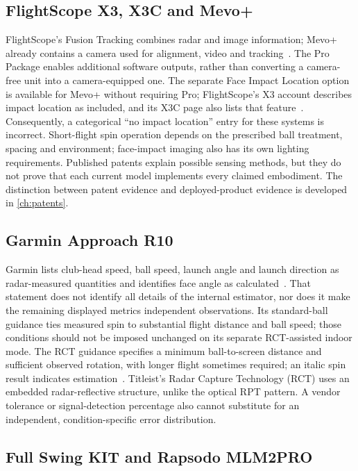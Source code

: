 \subsection{FlightScope X3, X3C and Mevo+}

FlightScope's Fusion Tracking combines radar and image information; Mevo+ already contains a camera used for alignment, video and tracking~\cite{flightscopefaq}.
The Pro Package enables additional software outputs, rather than converting a camera-free unit into a camera-equipped one.
The separate Face Impact Location option is available for Mevo+ without requiring Pro; FlightScope's X3 account describes impact location as included, and its X3C page also lists that feature~\cite{flightscopefaceimpact,flightscopex3csetup}.
Consequently, a categorical ``no impact location'' entry for these systems is incorrect.
Short-flight spin operation depends on the prescribed ball treatment, spacing and environment; face-impact imaging also has its own lighting requirements.
Published patents explain possible sensing methods, but they do not prove that each current model implements every claimed embodiment.
The distinction between patent evidence and deployed-product evidence is developed in \cref{ch:patents}.

\subsection{Garmin Approach R10}

Garmin lists club-head speed, ball speed, launch angle and launch direction as radar-measured quantities and identifies face angle as calculated~\cite{garminr10support}.
That statement does not identify all details of the internal estimator, nor does it make the remaining displayed metrics independent observations.
Its standard-ball guidance ties measured spin to substantial flight distance and ball speed; those conditions should not be imposed unchanged on its separate RCT-assisted indoor mode.
The RCT guidance specifies a minimum ball-to-screen distance and sufficient observed rotation, with longer flight sometimes required; an italic spin result indicates estimation~\cite{garminr10rct}.
Titleist's Radar Capture Technology (RCT) uses an embedded radar-reflective structure, unlike the optical RPT pattern.
A vendor tolerance or signal-detection percentage also cannot substitute for an independent, condition-specific error distribution.

\subsection{Full Swing KIT and Rapsodo MLM2PRO}

